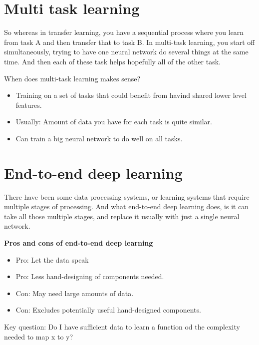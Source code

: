 \section*{Multi task learning}

So whereas in transfer learning, you have a sequential process where you learn from 
task A and then transfer that to task B. In multi-task learning, you start off 
simultaneously, trying to have one neural network do several things at the same time. 
And then each of these task helps hopefully all of the other task.

When does multi-task learning makes sense?

\begin{itemize}
    \item Training on a set of tasks that could benefit from havind shared lower level
    features. 
    \item Usually: Amount of data you have for each task is quite similar. 
    \item Can train a big neural network to do well on all tasks. 
\end{itemize}

\section*{End-to-end deep learning}

There have been some data processing systems, or learning systems that require multiple 
stages of processing. And what end-to-end deep learning does, is it can take all those 
multiple stages, and replace it usually with just a single neural network.

\textbf{Pros and cons of end-to-end deep learning}
\begin{itemize}
    \item Pro: Let the data speak
    \item Pro: Less hand-designing of components needed.
    \item Con: May need large amounts of data. 
    \item Con: Excludes potentially useful hand-designed components. 
\end{itemize}

Key question: Do I have sufficient data to learn a function od the complexity needed
to map x to y?

